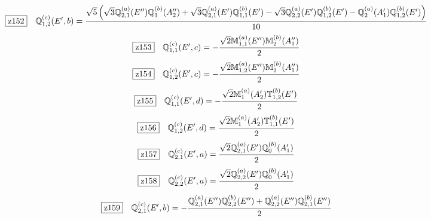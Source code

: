 \documentclass[fleqn,10pt,landscape]{jsarticle}
\begin{document}
\begin{dmath*}
\hspace*{3mm}\fbox{z152}\quad \mathbb{Q}_{1,2}^{(c)}(E^{\prime},b)=\frac{\sqrt{5} \left(\sqrt{3} \mathbb{Q}_{2,1}^{(a)}(E^{\prime\prime}) \mathbb{Q}_{1}^{(b)}(A_{2}^{\prime\prime}) + \sqrt{3} \mathbb{Q}_{2,1}^{(a)}(E^{\prime}) \mathbb{Q}_{1,1}^{(b)}(E^{\prime}) - \sqrt{3} \mathbb{Q}_{2,2}^{(a)}(E^{\prime}) \mathbb{Q}_{1,2}^{(b)}(E^{\prime}) - \mathbb{Q}_{2}^{(a)}(A_{1}^{\prime}) \mathbb{Q}_{1,2}^{(b)}(E^{\prime})\right)}{10}
\end{dmath*}
\begin{dmath*}
\hspace*{3mm}\fbox{z153}\quad \mathbb{Q}_{1,1}^{(c)}(E^{\prime},c)=- \frac{\sqrt{2} \mathbb{M}_{1,1}^{(a)}(E^{\prime\prime}) \mathbb{M}_{2}^{(b)}(A_{1}^{\prime\prime})}{2}
\end{dmath*}
\begin{dmath*}
\hspace*{3mm}\fbox{z154}\quad \mathbb{Q}_{1,2}^{(c)}(E^{\prime},c)=- \frac{\sqrt{2} \mathbb{M}_{1,2}^{(a)}(E^{\prime\prime}) \mathbb{M}_{2}^{(b)}(A_{1}^{\prime\prime})}{2}
\end{dmath*}
\begin{dmath*}
\hspace*{3mm}\fbox{z155}\quad \mathbb{Q}_{1,1}^{(c)}(E^{\prime},d)=- \frac{\sqrt{2} \mathbb{M}_{1}^{(a)}(A_{2}^{\prime}) \mathbb{T}_{1,2}^{(b)}(E^{\prime})}{2}
\end{dmath*}
\begin{dmath*}
\hspace*{3mm}\fbox{z156}\quad \mathbb{Q}_{1,2}^{(c)}(E^{\prime},d)=\frac{\sqrt{2} \mathbb{M}_{1}^{(a)}(A_{2}^{\prime}) \mathbb{T}_{1,1}^{(b)}(E^{\prime})}{2}
\end{dmath*}
\begin{dmath*}
\hspace*{3mm}\fbox{z157}\quad \mathbb{Q}_{2,1}^{(c)}(E^{\prime},a)=\frac{\sqrt{2} \mathbb{Q}_{2,1}^{(a)}(E^{\prime}) \mathbb{Q}_{0}^{(b)}(A_{1}^{\prime})}{2}
\end{dmath*}
\begin{dmath*}
\hspace*{3mm}\fbox{z158}\quad \mathbb{Q}_{2,2}^{(c)}(E^{\prime},a)=\frac{\sqrt{2} \mathbb{Q}_{2,2}^{(a)}(E^{\prime}) \mathbb{Q}_{0}^{(b)}(A_{1}^{\prime})}{2}
\end{dmath*}
\begin{dmath*}
\hspace*{3mm}\fbox{z159}\quad \mathbb{Q}_{2,1}^{(c)}(E^{\prime},b)=- \frac{\mathbb{Q}_{2,1}^{(a)}(E^{\prime\prime}) \mathbb{Q}_{2,2}^{(b)}(E^{\prime\prime}) + \mathbb{Q}_{2,2}^{(a)}(E^{\prime\prime}) \mathbb{Q}_{2,1}^{(b)}(E^{\prime\prime})}{2}
\end{dmath*}
\end{document}
